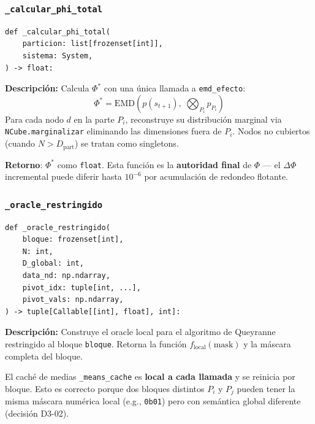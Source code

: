 \subsubsection*{\texttt{\_calcular\_phi\_total}}

\begin{lstlisting}
def _calcular_phi_total(
    particion: list[frozenset[int]],
    sistema: System,
) -> float:
\end{lstlisting}

\textbf{Descripción:} Calcula $\Phi^*$ con una única llamada a
\texttt{emd\_efecto}:
\[
\Phi^* = \mathrm{EMD}\!\left(p(s_{t+1}),\; \bigotimes_{P_i} p_{P_i}\right)
\]
Para cada nodo $d$ en la parte $P_i$, reconstruye su distribución marginal
via \texttt{NCube.marginalizar} eliminando las dimensiones fuera de $P_i$.
Nodos no cubiertos (cuando $N > D_{\text{part}}$) se tratan como singletons.

\textbf{Retorno}: $\Phi^*$ como \texttt{float}. Esta función es la
\textbf{autoridad final} de $\Phi$ — el $\Delta\Phi$ incremental puede diferir
hasta $10^{-6}$ por acumulación de redondeo flotante.

\subsubsection*{\texttt{\_oracle\_restringido}}

\begin{lstlisting}
def _oracle_restringido(
    bloque: frozenset[int],
    N: int,
    D_global: int,
    data_nd: np.ndarray,
    pivot_idx: tuple[int, ...],
    pivot_vals: np.ndarray,
) -> tuple[Callable[[int], float], int]:
\end{lstlisting}

\textbf{Descripción:} Construye el oracle local para el algoritmo de Queyranne
restringido al bloque \texttt{bloque}. Retorna la función
$f_{\text{local}}(\text{mask})$ y la máscara completa del bloque.

El caché de medias \texttt{\_means\_cache} es \textbf{local a cada llamada}
y se reinicia por bloque. Esto es correcto porque dos bloques distintos
$P_i$ y $P_j$ pueden tener la misma máscara numérica local (e.g., \texttt{0b01})
pero con semántica global diferente (decisión D3-02).

